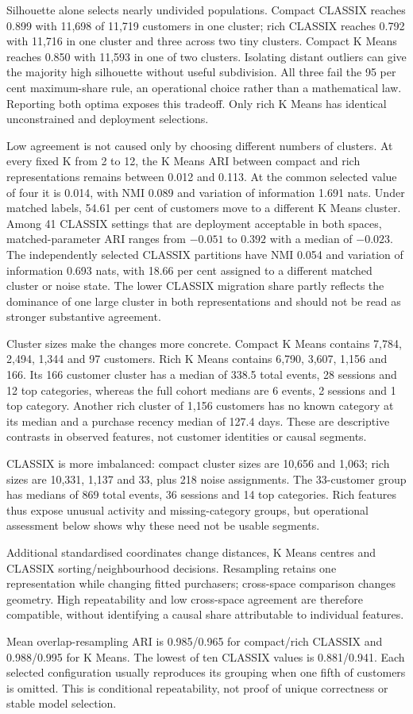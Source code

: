 Silhouette alone selects nearly undivided populations. Compact CLASSIX reaches 0.899 with 11,698 of 11,719 customers in one cluster; rich CLASSIX reaches 0.792 with 11,716 in one cluster and three across two tiny clusters. Compact K Means reaches 0.850 with 11,593 in one of two clusters. Isolating distant outliers can give the majority high silhouette without useful subdivision. All three fail the 95 per cent maximum-share rule, an operational choice rather than a mathematical law. Reporting both optima exposes this tradeoff. Only rich K Means has identical unconstrained and deployment selections.

Low agreement is not caused only by choosing different numbers of clusters. At every fixed K from 2 to 12, the K Means ARI between compact and rich representations remains between 0.012 and 0.113. At the common selected value of four it is 0.014, with NMI 0.089 and variation of information 1.691 nats. Under matched labels, 54.61 per cent of customers move to a different K Means cluster. Among 41 CLASSIX settings that are deployment acceptable in both spaces, matched-parameter ARI ranges from $-0.051$ to $0.392$ with a median of $-0.023$. The independently selected CLASSIX partitions have NMI 0.054 and variation of information 0.693 nats, with 18.66 per cent assigned to a different matched cluster or noise state. The lower CLASSIX migration share partly reflects the dominance of one large cluster in both representations and should not be read as stronger substantive agreement.

Cluster sizes make the changes more concrete. Compact K Means contains 7,784, 2,494, 1,344 and 97 customers. Rich K Means contains 6,790, 3,607, 1,156 and 166. Its 166 customer cluster has a median of 338.5 total events, 28 sessions and 12 top categories, whereas the full cohort medians are 6 events, 2 sessions and 1 top category. Another rich cluster of 1,156 customers has no known category at its median and a purchase recency median of 127.4 days. These are descriptive contrasts in observed features, not customer identities or causal segments.

CLASSIX is more imbalanced: compact cluster sizes are 10,656 and 1,063; rich sizes are 10,331, 1,137 and 33, plus 218 noise assignments. The 33-customer group has medians of 869 total events, 36 sessions and 14 top categories. Rich features thus expose unusual activity and missing-category groups, but operational assessment below shows why these need not be usable segments.

Additional standardised coordinates change distances, K Means centres and CLASSIX sorting/neighbourhood decisions. Resampling retains one representation while changing fitted purchasers; cross-space comparison changes geometry. High repeatability and low cross-space agreement are therefore compatible, without identifying a causal share attributable to individual features.

Mean overlap-resampling ARI is 0.985/0.965 for compact/rich CLASSIX and 0.988/0.995 for K Means. The lowest of ten CLASSIX values is 0.881/0.941. Each selected configuration usually reproduces its grouping when one fifth of customers is omitted. This is conditional repeatability, not proof of unique correctness or stable model selection.